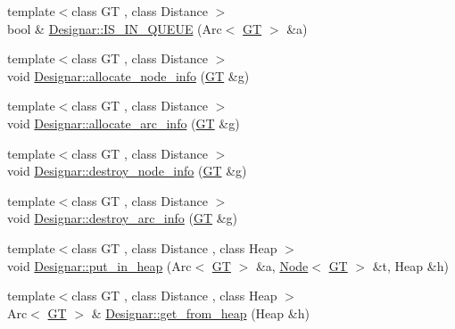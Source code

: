 \begin{DoxyCompactItemize}
\item 
{\footnotesize template$<$class GT , class Distance $>$ }\\bool \& \hyperlink{namespace_designar_aa57796582cb83d7459c43044ebf15f80}{Designar\+::\+I\+S\+\_\+\+I\+N\+\_\+\+Q\+U\+E\+UE} (Arc$<$ \hyperlink{demo-buildgraph_8_c_a3001c40d2c31ca87ed96cd7d1334a55e}{GT} $>$ \&a)
\item 
{\footnotesize template$<$class GT , class Distance $>$ }\\void \hyperlink{namespace_designar_aa44e92d6dbbdb33757bfacb5995bbdb3}{Designar\+::allocate\+\_\+node\+\_\+info} (\hyperlink{demo-buildgraph_8_c_a3001c40d2c31ca87ed96cd7d1334a55e}{GT} \&g)
\item 
{\footnotesize template$<$class GT , class Distance $>$ }\\void \hyperlink{namespace_designar_af0adaa2c965433759560c2894198f572}{Designar\+::allocate\+\_\+arc\+\_\+info} (\hyperlink{demo-buildgraph_8_c_a3001c40d2c31ca87ed96cd7d1334a55e}{GT} \&g)
\item 
{\footnotesize template$<$class GT , class Distance $>$ }\\void \hyperlink{namespace_designar_a51119e58f118766eed21754bcbe93ec1}{Designar\+::destroy\+\_\+node\+\_\+info} (\hyperlink{demo-buildgraph_8_c_a3001c40d2c31ca87ed96cd7d1334a55e}{GT} \&g)
\item 
{\footnotesize template$<$class GT , class Distance $>$ }\\void \hyperlink{namespace_designar_ae7f5b6163106f0008d39cbed1cb8eaa2}{Designar\+::destroy\+\_\+arc\+\_\+info} (\hyperlink{demo-buildgraph_8_c_a3001c40d2c31ca87ed96cd7d1334a55e}{GT} \&g)
\item 
{\footnotesize template$<$class GT , class Distance , class Heap $>$ }\\void \hyperlink{namespace_designar_a5a953a5892c101d5207d0844b367af70}{Designar\+::put\+\_\+in\+\_\+heap} (Arc$<$ \hyperlink{demo-buildgraph_8_c_a3001c40d2c31ca87ed96cd7d1334a55e}{GT} $>$ \&a, \hyperlink{test-mtreenode_8_c_a17a24b0725f59987143c5faf63c4dc6f}{Node}$<$ \hyperlink{demo-buildgraph_8_c_a3001c40d2c31ca87ed96cd7d1334a55e}{GT} $>$ \&t, Heap \&h)
\item 
{\footnotesize template$<$class GT , class Distance , class Heap $>$ }\\Arc$<$ \hyperlink{demo-buildgraph_8_c_a3001c40d2c31ca87ed96cd7d1334a55e}{GT} $>$ \& \hyperlink{namespace_designar_a6f1ec5f4fb17e9a3c3a6b02f724764f6}{Designar\+::get\+\_\+from\+\_\+heap} (Heap \&h)
\end{DoxyCompactItemize}
